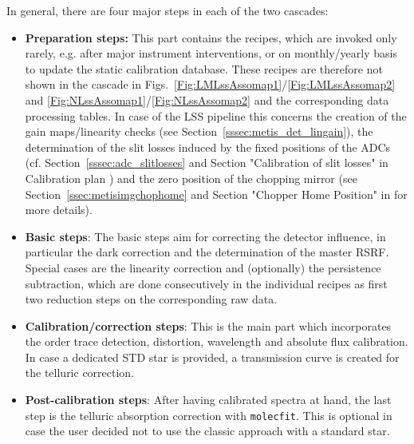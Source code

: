 In general, there are four major steps in each of the two cascades:
\begin{itemize}
    \item \textbf{Preparation steps:} This part contains the recipes, which are invoked only rarely, e.g. after major instrument interventions, or on monthly/yearly basis to update the static calibration database. These recipes are therefore not shown in the cascade in Figs.~\ref{Fig:LMLssAssomap1}/\ref{Fig:LMLssAssomap2} and \ref{Fig:NLssAssomap1}/\ref{Fig:NLssAssomap2} and the corresponding data processing tables. In case of the \ac{LSS} pipeline this concerns the creation of the gain maps/linearity checks (see Section~\ref{sssec:metis_det_lingain}), the determination of the slit losses induced by the fixed positions of the ADCs (cf. Section~\ref{sssec:adc_slitlosses} and Section "Calibration of slit losses" in Calibration plan \cite{METIS-calibration_plan}) and the zero position of the chopping mirror (see Section~\ref{ssec:metisimgchophome} and Section "Chopper Home Position" in \cite{METIS-calibration_plan} for more details). 
    \item \textbf{Basic steps}: The basic steps aim for correcting the detector influence, in particular the dark correction and the determination of the master \ac{RSRF}. Special cases are the linearity correction and (optionally) the persistence subtraction, which are done consecutively in the individual recipes as first two reduction steps on the corresponding raw data. %
    \item \textbf{Calibration/correction steps}: This is the main part which incorporates the order trace detection, distortion, wavelength and absolute flux calibration. In case a dedicated \ac{STD} star is provided, a transmission curve is created for the telluric correction.
    \item \textbf{Post-calibration steps}: After having calibrated spectra at hand, the last step is the telluric absorption correction with \texttt{molecfit}. This is optional in case the user decided not to use the classic approach with a standard star.
\end{itemize}

